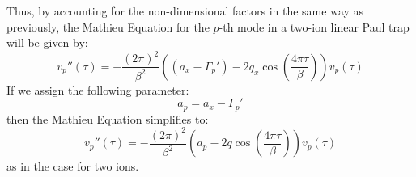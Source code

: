 \documentclass{article}
\begin{document}
Thus, by accounting for the non-dimensional factors in the same way as previously, the Mathieu Equation for the $p$-th mode in a two-ion linear Paul trap will be given by: %
\begin{equation}
	v_p '' (\tau) = - \frac{(2 \pi)^2}{\beta^2} \left( \left( a_x - \Gamma_p' \right) - 2 q_x \cos (\frac{4 \pi \tau}{\beta}) \right)	v_p (\tau)
\end{equation}
If we assign the following parameter:
\begin{equation}
a_p = a_x - \Gamma_p'
\end{equation}
then the Mathieu Equation simplifies to:
\begin{equation}
v_p '' (\tau) = - \frac{(2 \pi)^2}{\beta^2} \left( a_p - 2 q \cos \left( \frac{4 \pi \tau}{\beta} \right) \right)	 v_p (\tau)
\end{equation}
as in the case for two ions. 
\end{document}
